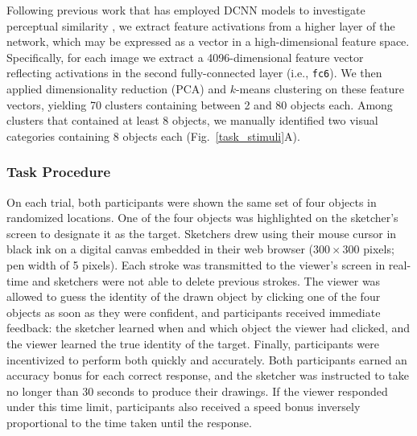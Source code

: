 \documentclass[10pt,letterpaper]{article}
\begin{document}
Following previous work that has employed DCNN models to investigate perceptual similarity \cite{FanCommon2018,peterson2018evaluating,kubilius2016deep}, we extract feature activations from a higher layer of the network, which may be expressed as a vector in a high-dimensional feature space.
Specifically, for each image we extract a 4096-dimensional feature vector reflecting activations in the second fully-connected layer (i.e., \texttt{fc6}).
We then applied dimensionality reduction (PCA) and $k$-means clustering on these feature vectors, yielding 70 clusters containing between 2 and 80 objects each.
Among clusters that contained at least 8 objects, we manually identified two visual categories containing 8 objects each (Fig.~\ref{task_stimuli}A).

\subsubsection{Task Procedure}

On each trial, both participants were shown the same set of four objects in randomized locations.
One of the four objects was highlighted on the sketcher's screen to designate it as the target.
Sketchers drew using their mouse cursor in black ink on a digital canvas embedded in their web browser ($300 \times 300$ pixels; pen width of 5 pixels).
Each stroke was transmitted to the viewer's screen in real-time and sketchers were not able to delete previous strokes.
The viewer was allowed to guess the identity of the drawn object by clicking one of the four objects as soon as they were confident, and participants received immediate feedback: the sketcher learned when and which object the viewer had clicked, and the viewer learned the true identity of the target.
Finally, participants were incentivized to perform both quickly and accurately.
Both participants earned an accuracy bonus for each correct response, and the sketcher was instructed to take no longer than 30 seconds to produce their drawings.
If the viewer responded under this time limit, participants also received a speed bonus inversely proportional to the time taken until the response.
\end{document}
